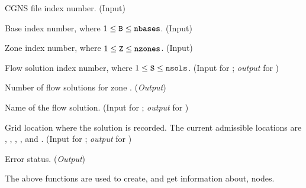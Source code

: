 \begin{Ventryi}{}\raggedright
\item [\fort{fn}]
      CGNS file index number.
      (\textcolor{input}{Input})
\item [\fort{B}]
      Base index number, where $1 \leq \text{{\normalfont\texttt{B}}} \leq \text{{\normalfont\texttt{nbases}}}$.
      (\textcolor{input}{Input})
\item [\fort{Z}]
      Zone index number, where $1 \leq \text{{\normalfont\texttt{Z}}} \leq \text{{\normalfont\texttt{nzones}}}$.
      (\textcolor{input}{Input})
\item [\fort{S}]
      Flow solution index number, where $1 \leq \text{{\normalfont\texttt{S}}} \leq \text{{\normalfont\texttt{nsols}}}$.
      (\textcolor{input}{Input} for ;
      \textcolor{output}{\textit{output}} for )
\item [\fort{nsols}]
      Number of flow solutions for zone .
      (\textcolor{output}{\textit{Output}})
\item [\fort{solname}]
      Name of the flow solution.
      (\textcolor{input}{Input} for ;
      \textcolor{output}{\textit{output}} for )
\item [\fort{location}]
      Grid location where the solution is recorded.
      The current admissible locations are ,
      , , ,
      and .
      (\textcolor{input}{Input} for ;
      \textcolor{output}{\textit{output}} for )
\item [\fort{ier}]
      Error status.
      (\textcolor{output}{\textit{Output}})
\end{Ventryi}

The above functions are used to create, and get information about,
 nodes.

